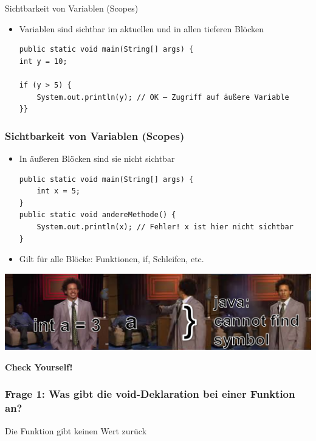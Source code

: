 \documentclass{../../presentation}
\begin{document}
\begin{frame}[fragile]{Sichtbarkeit von Variablen (Scopes)}
	\begin{itemize}
		\item\pause Variablen sind sichtbar im aktuellen und in allen tieferen Blöcken
		      \begin{verbatim}
public static void main(String[] args) {
int y = 10;

if (y > 5) {
    System.out.println(y); // OK – Zugriff auf äußere Variable
}}
    \end{verbatim}
	\end{itemize}
\end{frame}

\begin{frame}[fragile]
	\frametitle{Sichtbarkeit von Variablen (Scopes)}
	\begin{itemize}
		\item\pause In äußeren Blöcken sind sie nicht sichtbar
		      \begin{verbatim}
public static void main(String[] args) {
    int x = 5;
}
public static void andereMethode() {
    System.out.println(x); // Fehler! x ist hier nicht sichtbar
}
    \end{verbatim}

		\item\pause Gilt für alle Blöcke: Funktionen, if, Schleifen, etc.
	\end{itemize}
	\includegraphics[width=1\linewidth]{img/scopesmemehoriz.png}
\end{frame}


\begin{frame}[plain]
  \centering
  {\Huge\bfseries{Check Yourself!}}
\end{frame}

\begin{frame}[fragile]
  \frametitle{Frage 1: Was gibt die void-Deklaration bei einer Funktion an?}
  \begin{ausgabe}
    Die Funktion gibt keinen Wert zurück
  \end{ausgabe}
\end{frame}
\end{document}
